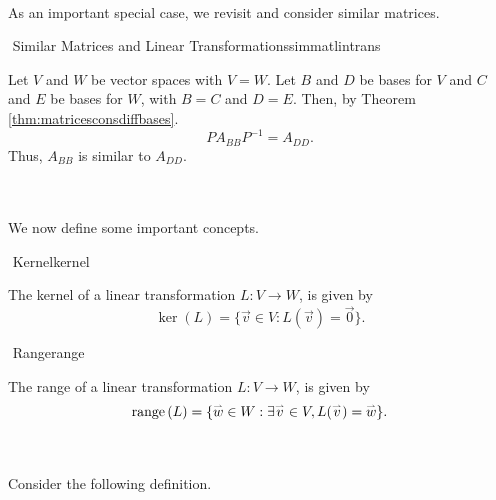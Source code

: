         \\
        As an important special case, we revisit and consider similar matrices.
        \begin{theorem}{\Stop\,\,Similar Matrices and Linear Transformations}{simmatlintrans}

            Let \(V\) and \(W\) be vector spaces with \(V=W\). Let \(B\) and \(D\) be bases for \(V\) and \(C\) and \(E\) be bases for \(W\), with \(B=C\) and \(D=E\). Then, by Theorem \ref{thm:matricesconsdiffbases}.
            \begin{equation*}
                PA_{BB}P^{-1}=A_{DD}.
            \end{equation*}
            Thus, \(A_{BB}\) is similar to \(A_{DD}\).
            
        \end{theorem}
        \pagebreak
        \vphantom
        \\
        \\
        We now define some important concepts.
        \begin{definition}{\Stop\,\,Kernel}{kernel}

            The kernel of a linear transformation \(L:V\to W\), is given by
            \begin{equation*}
                \ker(L)=\{\vec{v}\in V:L(\vec{v})=\vec{0}\}.
            \end{equation*}
            
        \end{definition}
        \begin{definition}{\Stop\,\,Range}{range}

            The range of a linear transformation \(L:V\to W\), is given by
            \begin{equation*}
                \text{range\,}(L)=\{\overset{_{\rightharpoonup}}{w}\in W:\exists\overset{_{\rightharpoonup}}{v}\in V, L(\overset{_{\rightharpoonup}}{v})=\overset{_{\rightharpoonup}}{w}\}.
            \end{equation*}
            
        \end{definition}
        \vphantom
        \\
        \\
        Consider the following definition.
